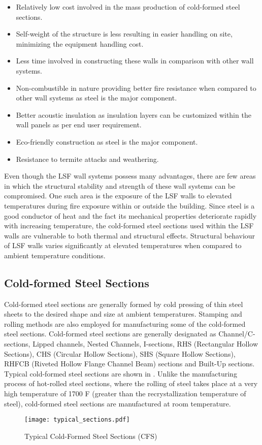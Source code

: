 \begin{itemize}
\item Relatively low cost involved in the mass production of cold-formed steel sections.
\item Self-weight of the structure is less resulting in easier handling on site, minimizing the equipment handling cost.
\item Less time involved in constructing these walls in comparison with other wall systems.
\item Non-combustible in nature providing better fire resistance when compared to other wall systems as steel is the major component.
\item Better acoustic insulation as insulation layers can be customized within the wall panels as per end user requirement.
\item Eco-friendly construction as steel is the major component.
\item Resistance to termite attacks and weathering.
\end{itemize}

Even though the LSF wall systems possess many advantages, there are few areas in which the structural stability and strength of these wall systems can be compromised. One such area is the exposure of the LSF walls to elevated temperatures during fire exposure within or outside the building. Since steel is a good conductor of heat and the fact its mechanical properties deteriorate rapidly with increasing temperature, the cold-formed steel sections used within the LSF walls are vulnerable to both thermal and structural effects. Structural behaviour of LSF walls varies significantly at elevated temperatures when compared to ambient temperature conditions.

\subsection{Cold-formed Steel Sections}

Cold-formed steel sections are generally formed by cold pressing of thin steel sheets to the desired shape and size at ambient temperatures. Stamping and rolling methods are also employed for manufacturing some of the cold-formed steel sections. Cold-formed steel sections are generally designated as Channel/C-sections, Lipped channels, Nested Channels, I-sections, RHS (Rectangular Hollow Sections), CHS (Circular Hollow Sections), SHS (Square Hollow Sections), RHFCB (Riveted Hollow Flange Channel Beam) sections and Built-Up sections. Typical cold-formed steel sections are shown in . Unlike the manufacturing process of hot-rolled steel sections, where the rolling of steel takes place at a very high temperature of 1700 \degree F (greater than the recrystallization temperature of steel), cold-formed steel sections are manufactured at room temperature.
\begin{figure}[htbp]
	\centering	
		\texttt{[image: typical\_sections.pdf]}
		\caption{Typical Cold-Formed Steel Sections (CFS)}
		\label{fig:typical_section}
\end{figure}

